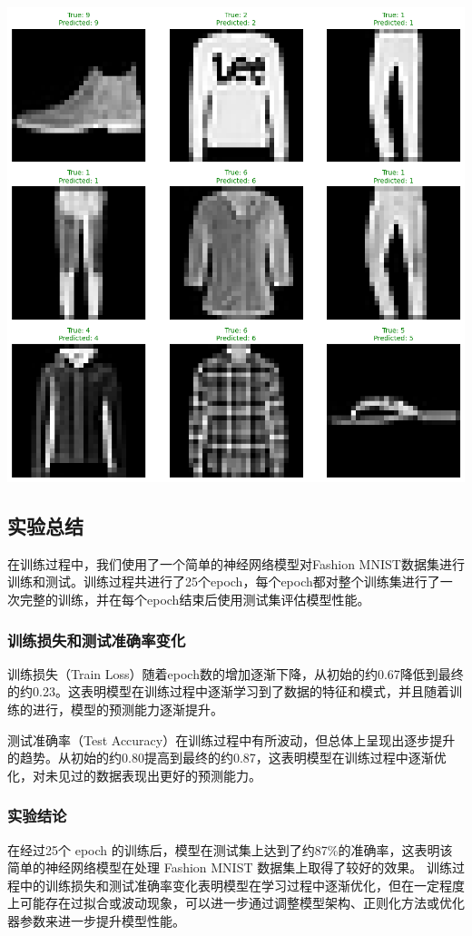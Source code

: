 \documentclass[a4paper,12pt]{article}
\begin{document}
\includegraphics[width=0.8\linewidth]{images/lab1_3_result.png}

\justifying

\subsection{实验总结}
在训练过程中，我们使用了一个简单的神经网络模型对Fashion MNIST数据集进行训练和测试。训练过程共进行了25个epoch，每个epoch都对整个训练集进行了一次完整的训练，并在每个epoch结束后使用测试集评估模型性能。

\subsubsection{训练损失和测试准确率变化}
训练损失（Train Loss）随着epoch数的增加逐渐下降，从初始的约0.67降低到最终的约0.23。这表明模型在训练过程中逐渐学习到了数据的特征和模式，并且随着训练的进行，模型的预测能力逐渐提升。

测试准确率（Test Accuracy）在训练过程中有所波动，但总体上呈现出逐步提升的趋势。从初始的约0.80提高到最终的约0.87，这表明模型在训练过程中逐渐优化，对未见过的数据表现出更好的预测能力。
\subsubsection{实验结论}

在经过25个 epoch 的训练后，模型在测试集上达到了约87\%的准确率，这表明该简单的神经网络模型在处理 Fashion MNIST 数据集上取得了较好的效果。
训练过程中的训练损失和测试准确率变化表明模型在学习过程中逐渐优化，但在一定程度上可能存在过拟合或波动现象，可以进一步通过调整模型架构、正则化方法或优化器参数来进一步提升模型性能。
\end{document}

